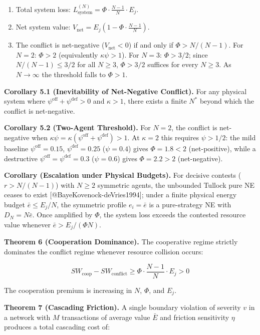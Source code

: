 \documentclass[11pt]{article}
\begin{document}
\begin{enumerate}
\def\labelenumi{(\alph{enumi})}
\item
  Total system loss:
  \(L_{\text{system}}^{(N)} = \Phi \cdot \frac{N-1}{N} \cdot E_j\).
\item
  Net system value:
  \(V_{\text{net}} = E_j\left(1 - \Phi \cdot \frac{N-1}{N}\right)\).
\item
  The conflict is net-negative (\(V_{\text{net}} < 0\)) if and only if
  \(\Phi > N/(N-1)\). For \(N = 2\): \(\Phi > 2\) (equivalently
  \(\kappa\psi > 1\)). For \(N = 3\): \(\Phi > 3/2\); since
  \(N/(N-1) \leq 3/2\) for all \(N \geq 3\), \(\Phi > 3/2\) suffices for
  every \(N \geq 3\). As \(N \to \infty\) the threshold falls to
  \(\Phi > 1\).
\end{enumerate}

\textbf{Corollary 5.1 (Inevitability of Net-Negative Conflict).} For any
physical system where \(\psi^{\text{off}} + \psi^{\text{def}} > 0\) and
\(\kappa > 1\), there exists a finite \(N^*\) beyond which the conflict
is net-negative.

\textbf{Corollary 5.2 (Two-Agent Threshold).} For \(N = 2\), the
conflict is net-negative when
\(\kappa\psi = \kappa(\psi^{\text{off}} + \psi^{\text{def}}) > 1\). At
\(\kappa = 2\) this requires \(\psi > 1/2\): the mild baseline
\(\psi^{\text{off}} = 0.15\), \(\psi^{\text{def}} = 0.25\)
(\(\psi = 0.4\)) gives \(\Phi = 1.8 < 2\) (net-positive), while a
destructive \(\psi^{\text{off}} = \psi^{\text{def}} = 0.3\)
(\(\psi = 0.6\)) gives \(\Phi = 2.2 > 2\) (net-negative).

\textbf{Corollary (Escalation under Physical Budgets).} For decisive
contests (\(r > N/(N-1)\)) with \(N \geq 2\) symmetric agents, the
unbounded Tullock pure NE ceases to exist
{[}@BayeKovenock-deVries1994{]}; under a finite physical energy budget
\(\bar e \leq E_j/N\), the symmetric profile \(e_i = \bar e\) is a
pure-strategy NE with \(D_N = N \bar e\). Once amplified by \(\Phi\),
the system loss exceeds the contested resource value whenever
\(\bar e > E_j/(\Phi N)\).

\textbf{Theorem 6 (Cooperation Dominance).} The cooperative regime
strictly dominates the conflict regime whenever resource collision
occurs:

\[SW_{\text{coop}} - SW_{\text{conflict}} \geq \Phi \cdot \frac{N-1}{N} \cdot E_j > 0\]

The cooperation premium is increasing in \(N\), \(\Phi\), and \(E_j\).

\textbf{Theorem 7 (Cascading Friction).} A single boundary violation of
severity \(v\) in a network with \(M\) transactions of average value
\(\bar{E}\) and friction sensitivity \(\eta\) produces a total cascading
cost of:
\end{document}
